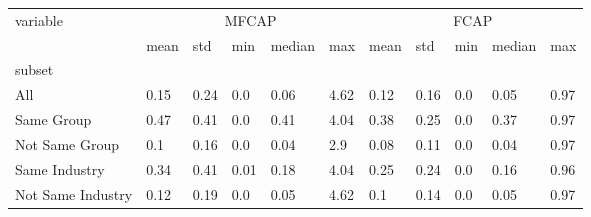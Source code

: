 \begin{tabular}{lllllllllll}
\toprule
variable & \multicolumn{5}{c}{MFCAP} & \multicolumn{5}{c}{FCAP} \\
 &       mean &   std &   min & median &   max &         mean &   std &  min & median &   max \\
 \cmidrule[lr]{2-6} \cmidrule{7-11}
subset            &            &       &       &        &       &              &       &      &        &       \\
\midrule
All               &       0.15 &  0.24 &   0.0 &   0.06 &  4.62 &         0.12 &  0.16 &  0.0 &   0.05 &  0.97 \\
Same Group        &       0.47 &  0.41 &   0.0 &   0.41 &  4.04 &         0.38 &  0.25 &  0.0 &   0.37 &  0.97 \\
Not Same Group    &        0.1 &  0.16 &   0.0 &   0.04 &   2.9 &         0.08 &  0.11 &  0.0 &   0.04 &  0.97 \\
Same Industry     &       0.34 &  0.41 &  0.01 &   0.18 &  4.04 &         0.25 &  0.24 &  0.0 &   0.16 &  0.96 \\
Not Same Industry &       0.12 &  0.19 &   0.0 &   0.05 &  4.62 &          0.1 &  0.14 &  0.0 &   0.05 &  0.97 \\
\bottomrule
\end{tabular}
